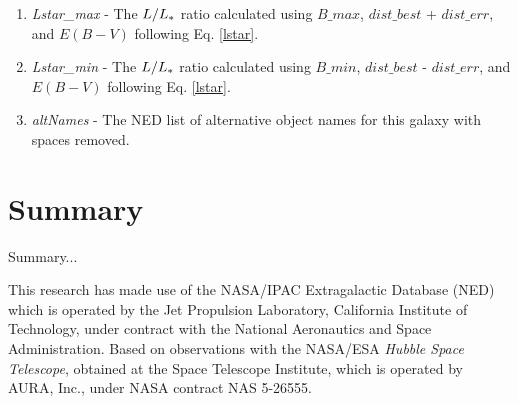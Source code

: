 \documentclass[iop]{emulateapj-rtx4}
\begin{document}
\begin{enumerate}
\item \textit{Lstar\_max} - The $L / L_{\**}$ ratio calculated using $B\_max$, $dist\_best$ + $dist\_err$, and $E(B-V)$ following Eq. \ref{lstar}.

\item \textit{Lstar\_min} - The $L / L_{\**}$ ratio calculated using $B\_min$, $dist\_best$ - $dist\_err$, and $E(B-V)$ following Eq. \ref{lstar}.

\item \textit{altNames} - The NED list of alternative object names for this galaxy with spaces removed.


\end{enumerate}


\section{Summary}

Summary...


This research has made use of the NASA/IPAC Extragalactic Database (NED) which is operated by the Jet Propulsion Laboratory, California Institute of Technology, under contract with the National Aeronautics and Space Administration. Based on observations with the NASA/ESA \textit{Hubble Space Telescope}, obtained at the Space Telescope Institute, which is operated by AURA, Inc., under NASA contract NAS 5-26555.


\nocite{*}


\end{document}
